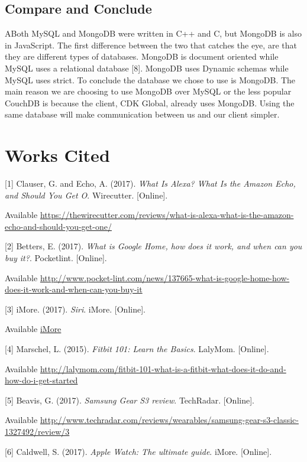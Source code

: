 \documentclass[onecolumn, draftclsnofoot,10pt, compsoc]{IEEEtran}
\begin{document}
	\subsection{Compare and Conclude}
	
		ABoth MySQL and MongoDB were written in C++ and C, but MongoDB is also in JavaScript. The first difference between the two that catches the eye, are that they are different types of databases. MongoDB is document oriented while MySQL uses a relational database [8]. MongoDB uses 
		Dynamic schemas while MySQL uses strict. To conclude the database we chose to use is MongoDB. The main reason we are choosing to use MongoDB over MySQL or the less popular CouchDB is because the client, CDK Global, already uses MongoDB. Using the same database will make communication
		between us and our client simpler.
		

	
\section{Works Cited}

[1] Clauser, G. and Echo, A. (2017). \textit{What Is Alexa? What Is the Amazon Echo, and Should You Get O}. Wirecutter. [Online].

Available \url{https://thewirecutter.com/reviews/what-is-alexa-what-is-the-amazon-echo-and-should-you-get-one/}


[2] Betters, E.  (2017). \textit{What is Google Home, how does it work, and when can you buy it?}. Pocketlint. [Online].

Available \url{http://www.pocket-lint.com/news/137665-what-is-google-home-how-does-it-work-and-when-can-you-buy-it}


[3] iMore. (2017). \textit{Siri}. iMore. [Online]. 

Available \url{iMore}


[4]	Marschel, L. (2015). \textit{Fitbit 101: Learn the Basics}. LalyMom. [Online]. 

Available \url{http://lalymom.com/fitbit-101-what-is-a-fitbit-what-does-it-do-and-how-do-i-get-started}


[5] Beavis, G. (2017). \textit{Samsung Gear S3 review}. TechRadar. [Online]. 

Available \url{http://www.techradar.com/reviews/wearables/samsung-gear-s3-classic-1327492/review/3}

[6]	Caldwell, S. (2017).  \textit{Apple Watch: The ultimate guide}. iMore. [Online]. 
\end{document}
